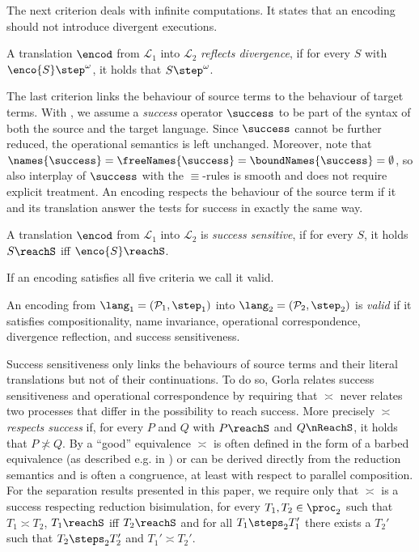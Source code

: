 \documentclass[]{article}
\begin{document}
The next criterion deals with infinite computations. It states that an encoding should not introduce divergent executions.

	\label{divre}
	A translation $\encod$ from $\mathcal{L}_1$ into $\mathcal{L}_2$ \emph{reflects divergence}, if for every $S$ with $ \enco{S} \step^{\omega} $, it holds that $ S \step^{\omega} $.
\ekrit

The last criterion links the behaviour of source terms to the behaviour of target terms. With \cite{gorla}, we assume a \emph{success} operator $ \success $ to be part of the syntax of both the source and the target language.
Since $ \success $ cannot be further reduced, the operational semantics is left unchanged. Moreover, note that $ \names{\success} = \freeNames{\success} = \boundNames{\success} = \emptyset $, so also interplay of $\success$ with the $\equiv$-rules is smooth and does not require explicit treatment.
An encoding respects the behaviour of the source term if it and its translation answer the tests for success in exactly the same way.

	\label{succse}
	A translation $\encod$ from $ \mathcal{L}_1 $ into $ \mathcal{L}_2 $ is \emph{success sensitive}, if for every $S$, it holds $ S \reachS $ iff $ \enco{S} \reachS $.
\ekrit

If an encoding satisfies all five criteria we call it valid.

\begin{definition}
	An encoding from $ \lang_1 = \left( \mathcal{P}_1, \step_1 \right) $ into $ \lang_2 = \left( \mathcal{P}_2, \step_2 \right) $ is \emph{valid} if it satisfies compositionality, name invariance, operational correspondence, divergence reflection, and success sensitiveness.
\end{definition}

Success sensitiveness only links the behaviours of source terms and their literal translations but not of their continuations. To do so, Gorla relates success sensitiveness and operational correspondence by requiring that $ \asymp $ never relates two processes that differ in the possibility to reach success. More precisely $ \asymp $ \emph{respects success} if, for every $ P $ and $ Q $ with $ P \reachS $ and $ Q \nReachS $, it holds that $ P \not\asymp Q $.
By \cite{gorla} a ``good'' equivalence $ \asymp $ is often defined in the form of a barbed equivalence (as described e.g. in \cite{milnerSangiorgi92}) or can be derived directly from the reduction semantics and is often a congruence, at least with respect to parallel composition. For the separation results presented in this paper, we require only that $ \asymp $ is a success respecting reduction bisimulation, \ie for every $ T_1, T_2 \in \proc_2 $ such that $ T_1 \asymp T_2 $, $ T_1 \reachS $ iff $ T_2 \reachS $ and for all $ T_1 \steps_2 T_1' $ there exists a $ T_2' $ such that $ T_2 \steps_2 T_2' $ and $ T_1' \asymp T_2' $.
\end{document}
